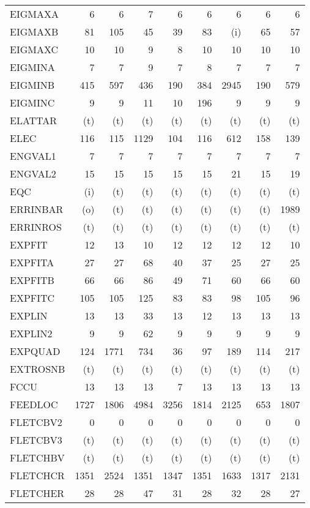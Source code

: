 \documentclass[11pt,twoside]{article}
\begin{document}
{\begin{longtable}[c]{|l|r|r|r|r|r|r|r|r|}
 EIGMAXA & 6 & 6 & 7 & 6 & 6 & 6 & 6 & 6 \\
 EIGMAXB & 81 & 105 & 45 & 39 & 83 & (i) & 65 & 57 \\
 EIGMAXC & 10 & 10 & 9 & 8 & 10 & 10 & 10 & 10 \\
 EIGMINA & 7 & 7 & 9 & 7 & 8 & 7 & 7 & 7 \\
 EIGMINB & 415 & 597 & 436 & 190 & 384 & 2945 & 190 & 579 \\
 EIGMINC & 9 & 9 & 11 & 10 & 196 & 9 & 9 & 9 \\
 ELATTAR & (t) & (t) & (t) & (t) & (t) & (t) & (t) & (t) \\
 ELEC & 116 & 115 & 1129 & 104 & 116 & 612 & 158 & 139 \\
 ENGVAL1 & 7 & 7 & 7 & 7 & 7 & 7 & 7 & 7 \\
 ENGVAL2 & 15 & 15 & 15 & 15 & 15 & 21 & 15 & 19 \\
 EQC & (i) & (t) & (t) & (t) & (t) & (t) & (t) & (t) \\
 ERRINBAR & (o) & (t) & (t) & (t) & (t) & (t) & (t) & 1989 \\
 ERRINROS & (t) & (t) & (t) & (t) & (t) & (t) & (t) & (t) \\
 EXPFIT & 12 & 13 & 10 & 12 & 12 & 12 & 12 & 10 \\
 EXPFITA & 27 & 27 & 68 & 40 & 37 & 25 & 27 & 25 \\
 EXPFITB & 66 & 66 & 86 & 49 & 71 & 60 & 66 & 60 \\
 EXPFITC & 105 & 105 & 125 & 83 & 83 & 98 & 105 & 96 \\
 EXPLIN & 13 & 13 & 33 & 13 & 12 & 13 & 13 & 13 \\
 EXPLIN2 & 9 & 9 & 62 & 9 & 9 & 9 & 9 & 9 \\
 EXPQUAD & 124 & 1771 & 734 & 36 & 97 & 189 & 114 & 217 \\
 EXTROSNB & (t) & (t) & (t) & (t) & (t) & (t) & (t) & (t) \\
 FCCU & 13 & 13 & 13 & 7 & 13 & 13 & 13 & 13 \\
 FEEDLOC & 1727 & 1806 & 4984 & 3256 & 1814 & 2125 & 653 & 1807 \\
 FLETCBV2 & 0 & 0 & 0 & 0 & 0 & 0 & 0 & 0 \\
 FLETCBV3 & (t) & (t) & (t) & (t) & (t) & (t) & (t) & (t) \\
 FLETCHBV & (t) & (t) & (t) & (t) & (t) & (t) & (t) & (t) \\
 FLETCHCR & 1351 & 2524 & 1351 & 1347 & 1351 & 1633 & 1317 & 2131 \\
 FLETCHER & 28 & 28 & 47 & 31 & 28 & 32 & 28 & 27 \\

\end{longtable}}
\end{document}

